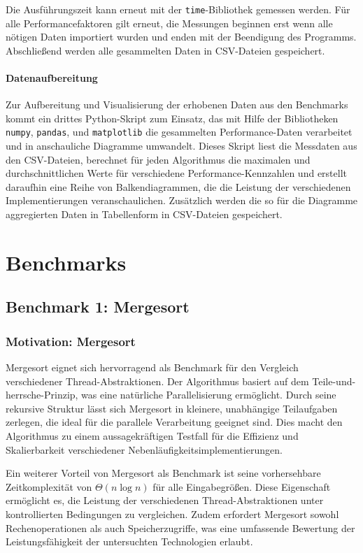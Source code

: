 \documentclass[fontsize=12pt,paper=a4,twoside=semi,parskip=half-,headsepline,headinclude]{scrreprt}
\begin{document}
Die Ausführungszeit kann erneut mit der \texttt{time}-Bibliothek gemessen werden. Für alle Performancefaktoren gilt erneut, die Messungen beginnen erst wenn alle nötigen Daten importiert wurden und enden mit der Beendigung des Programms. Abschließend werden alle gesammelten Daten in CSV-Dateien gespeichert. 

\subsubsection{Datenaufbereitung}

Zur Aufbereitung und Visualisierung der erhobenen Daten aus den Benchmarks kommt ein drittes Python-Skript zum Einsatz, das mit Hilfe der Bibliotheken \texttt{numpy}, \texttt{pandas}, und \texttt{matplotlib} die gesammelten Performance-Daten verarbeitet und in anschauliche Diagramme umwandelt. Dieses Skript liest die Messdaten aus den CSV-Dateien, berechnet für jeden Algorithmus die maximalen und durchschnittlichen Werte für verschiedene Performance-Kennzahlen und erstellt daraufhin eine Reihe von Balkendiagrammen, die die Leistung der verschiedenen Implementierungen veranschaulichen. Zusätzlich werden die so für die Diagramme aggregierten Daten in Tabellenform in CSV-Dateien gespeichert.

\chapter{Benchmarks}

\section{Benchmark 1: Mergesort}

\subsection{Motivation: Mergesort}
Mergesort eignet sich hervorragend als Benchmark für den Vergleich verschiedener Thread-Abstraktionen. Der Algorithmus basiert auf dem Teile-und-herrsche-Prinzip, was eine natürliche Parallelisierung ermöglicht. Durch seine rekursive Struktur lässt sich Mergesort in kleinere, unabhängige Teilaufgaben zerlegen, die ideal für die parallele Verarbeitung geeignet sind. Dies macht den Algorithmus zu einem aussagekräftigen Testfall für die Effizienz und Skalierbarkeit verschiedener Nebenläufigkeitsimplementierungen.

Ein weiterer Vorteil von Mergesort als Benchmark ist seine vorhersehbare Zeitkomplexität von $\Theta(n\log{}n)$ für alle Eingabegrößen. Diese Eigenschaft ermöglicht es, die Leistung der verschiedenen Thread-Abstraktionen unter kontrollierten Bedingungen zu vergleichen. Zudem erfordert Mergesort sowohl Rechenoperationen als auch Speicherzugriffe, was eine umfassende Bewertung der Leistungsfähigkeit der untersuchten Technologien erlaubt.
\end{document}
